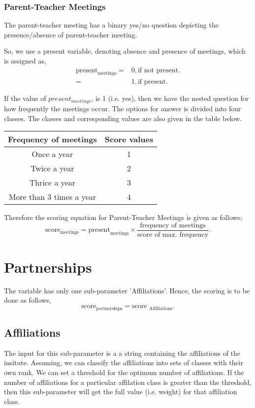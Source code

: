 \documentclass[oneside,twocolumn]{article}
\begin{document}
\subsubsection{Parent-Teacher Meetings}
The parent-teacher meeting has a binary yes/no question
depicting the presence/absence of parent-teacher meeting.

So, we use a present variable, denoting absence and presence
of meetings, which is assigned as,
\begin{align*}
  \text{present}_{\text{meetings}} =& 0, \text{if not present.} \\
  =& 1, \text{if present.}
\end{align*}

If the value of \(present_{meetings}\), is 1 (i.e. yes), then
we have the nested question for how frequently the meetings
occur. The options for answer is divided into four classes.
The classes and corresponding values are also given in the
table below.
\begin{center}
  \begin{tabular}{c|c}
    \hline
    Frequency of meetings & Score values \\ \hline
    Once a year & 1 \\
    Twice a year & 2 \\
    Thrice a year & 3 \\
    More than 3 times a year & 4 \\ \hline
  \end{tabular}
\end{center}
Therefore the scoring equation for Parent-Teacher Meetings
is given as follows;
\[
\text{score}_{\text{meetings}} = \text{present}_{\text{meetings}} \times \dfrac{\text{frequency of meetings}}{\text{score of max. frequency}}.
\]

\section{Partnerships}
The variable has only one sub-parameter 'Affiliations'.
Hence, the scoring is to be done as follows,
\[
\text{score}_{\text{partnerships}} = \text{score }_{\text{Affiliations}}.
\]
\subsection{Affiliations}
The input for this sub-parameter is a a string containing the
affiliations of the insitute. Assuming, we can classify the
affiliations into sets of classes with their own rank. We can
set a threshold for the optimum number of affiliations. If the
number of affiliations for a particular affilation class is
greater than the threshold, then this sub-parameter will get the
full value (i.e. weight) for that affiliation class.
\end{document}
